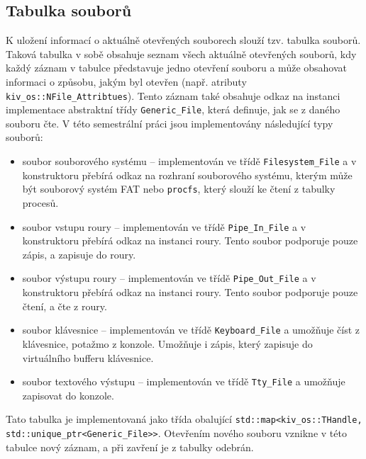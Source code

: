 \documentclass[12pt, a4paper]{article}
\begin{document}
\subsection{Tabulka souborů}
K uložení informací o aktuálně otevřených souborech slouží tzv. tabulka souborů. Taková tabulka v sobě obsahuje seznam všech aktuálně otevřených souborů, kdy každý záznam v tabulce představuje jedno otevření souboru a může obsahovat informaci o způsobu, jakým byl otevřen (např. atributy \texttt{kiv\_os::NFile\_Attribtues}). Tento záznam také obsahuje odkaz na instanci implementace abstraktní třídy \texttt{Generic\_File}, která definuje, jak se z daného souboru čte. V této semestrální práci jsou implementovány následující typy souborů:

\begin{itemize}

    \item soubor souborového systému -- implementován ve třídě \texttt{Filesystem\_File} a v konstruktoru přebírá odkaz na rozhraní souborového systému, kterým může být souborový systém FAT nebo \texttt{procfs}, který slouží ke čtení z tabulky procesů.

    \item soubor vstupu roury -- implementován ve třídě \texttt{Pipe\_In\_File} a v konstruktoru přebírá odkaz na instanci roury. Tento soubor podporuje pouze zápis, a zapisuje do roury.

    \item soubor výstupu roury -- implementován ve třídě \texttt{Pipe\_Out\_File} a v konstruktoru přebírá odkaz na instanci roury. Tento soubor podporuje pouze čtení, a čte z roury.

    \item soubor klávesnice -- implementován ve třídě \texttt{Keyboard\_File} a umožňuje číst z klávesnice, potažmo z konzole. Umožňuje i zápis, který zapisuje do virtuálního bufferu klávesnice.

    \item soubor textového výstupu -- implementován ve třídě \texttt{Tty\_File} a umožňuje zapisovat do konzole.

\end{itemize}

Tato tabulka je implementovaná jako třída obalující \texttt{std::map<kiv\_os::THandle, std::unique\_ptr<Generic\_File>>}. Otevřením nového souboru vznikne v této tabulce nový záznam, a při zavření je z tabulky odebrán.
\end{document}

